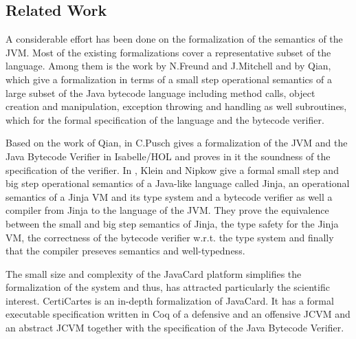 \subsection{Related Work}\label{relWork}
 A considerable effort has been done on the formalization of 
 the semantics of the JVM. Most of the existing formalizations cover a representative subset 
 of the language. Among them is the work \cite{FM99FFJ} by N.Freund and J.Mitchell and \cite{qian99formal} by Qian,
 which give a formalization in terms of a small step operational semantics of a
 large subset of the Java bytecode language including method calls, object creation and manipulation,
 exception throwing and handling as well subroutines, which for the formal specification of the language and the bytecode verifier.

 Based on the work of Qian, in \cite{pusch98proving} C.Pusch gives a formalization of the JVM and the Java Bytecode Verifier
 in Isabelle/HOL and proves in it the soundness of the specification of the verifier.
 In \cite{KleinN04}, Klein and Nipkow give a formal small step and big step operational
 semantics of a Java-like language called Jinja, an operational semantics of a Jinja VM and its type system and a bytecode verifier as well a compiler from Jinja
 to the language of the JVM. They prove the equivalence between the small and big step semantics of Jinja, the  type safety for the Jinja VM, the correctness
 of the bytecode verifier w.r.t. the type system and finally that the compiler preseves semantics and well-typedness.
  
 The small size and complexity of the JavaCard platform simplifies the formalization of the system and thus,
 has attracted  particularly the scientific interest. CertiCartes \cite{barthe01formal,barthe02formal}
 is an in-depth formalization of JavaCard. It has a formal executable
 specification written in Coq of a defensive and an offensive JCVM and an abstract JCVM together with the specification
 of the Java Bytecode Verifier.  
